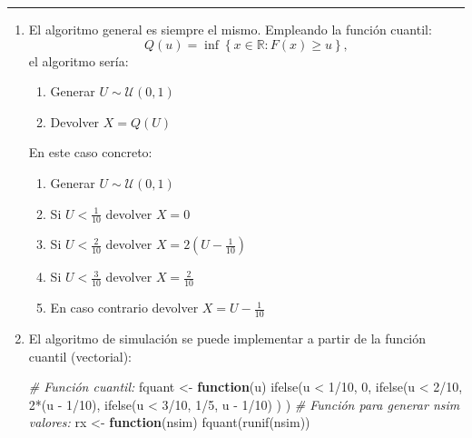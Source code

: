 \documentclass[
]{book}
\newenvironment{Shaded}{\begin{snugshade}}{\end{snugshade}}
\newcommand{\CommentTok}[1]{\textcolor[rgb]{0.56,0.35,0.01}{\textit{#1}}}
\newcommand{\ControlFlowTok}[1]{\textcolor[rgb]{0.13,0.29,0.53}{\textbf{#1}}}
\newcommand{\DecValTok}[1]{\textcolor[rgb]{0.00,0.00,0.81}{#1}}
\newcommand{\FunctionTok}[1]{\textcolor[rgb]{0.00,0.00,0.00}{#1}}
\newcommand{\NormalTok}[1]{#1}
\newcommand{\OtherTok}[1]{\textcolor[rgb]{0.56,0.35,0.01}{#1}}
\newcommand{\SpecialCharTok}[1]{\textcolor[rgb]{0.00,0.00,0.00}{#1}}
\theoremstyle{break}
\theoremstyle{nonumberplain}
\begin{document}
\begin{center}\rule{0.5\linewidth}{0.5pt}\end{center}

\begin{enumerate}
\def\labelenumi{\alph{enumi})}
\item
  El algoritmo general es siempre el mismo. Empleando la función cuantil:
  \[Q\left( u\right) = \inf \left\{ x\in \mathbb{R}:F\left( x\right) 
  \geq u\right\},\]
  el algoritmo sería:

  \begin{enumerate}
  \def\labelenumii{\arabic{enumii}.}
  \item
    Generar \(U\sim \mathcal{U}\left( 0,1\right)\)
  \item
    Devolver \(X=Q\left( U\right)\)
  \end{enumerate}

  En este caso concreto:

  \begin{enumerate}
  \def\labelenumii{\arabic{enumii}.}
  \item
    Generar \(U\sim \mathcal{U}\left( 0,1\right)\)
  \item
    Si \(U < \frac{1}{10}\) devolver \(X = 0\)
  \item
    Si \(U < \frac{2}{10}\) devolver \(X = 2(U - \frac{1}{10})\)
  \item
    Si \(U < \frac{3}{10}\) devolver \(X = \frac{2}{10}\)
  \item
    En caso contrario devolver \(X = U - \frac{1}{10}\)
  \end{enumerate}
\item
  El algoritmo de simulación se puede implementar a partir de la función cuantil
  (vectorial):

\begin{Shaded}
\begin{Highlighting}[]
\CommentTok{\# Función cuantil:}
\NormalTok{fquant }\OtherTok{\textless{}{-}} \ControlFlowTok{function}\NormalTok{(u) }
  \FunctionTok{ifelse}\NormalTok{(u }\SpecialCharTok{\textless{}} \DecValTok{1}\SpecialCharTok{/}\DecValTok{10}\NormalTok{, }\DecValTok{0}\NormalTok{,}
         \FunctionTok{ifelse}\NormalTok{(u }\SpecialCharTok{\textless{}} \DecValTok{2}\SpecialCharTok{/}\DecValTok{10}\NormalTok{, }\DecValTok{2}\SpecialCharTok{*}\NormalTok{(u }\SpecialCharTok{{-}} \DecValTok{1}\SpecialCharTok{/}\DecValTok{10}\NormalTok{),}
                \FunctionTok{ifelse}\NormalTok{(u }\SpecialCharTok{\textless{}} \DecValTok{3}\SpecialCharTok{/}\DecValTok{10}\NormalTok{, }\DecValTok{1}\SpecialCharTok{/}\DecValTok{5}\NormalTok{, u }\SpecialCharTok{{-}} \DecValTok{1}\SpecialCharTok{/}\DecValTok{10}\NormalTok{) ) )}
\CommentTok{\# Función para generar nsim valores:}
\NormalTok{rx }\OtherTok{\textless{}{-}} \ControlFlowTok{function}\NormalTok{(nsim) }\FunctionTok{fquant}\NormalTok{(}\FunctionTok{runif}\NormalTok{(nsim))}
\end{Highlighting}
\end{Shaded}


\end{enumerate}
\end{document}
